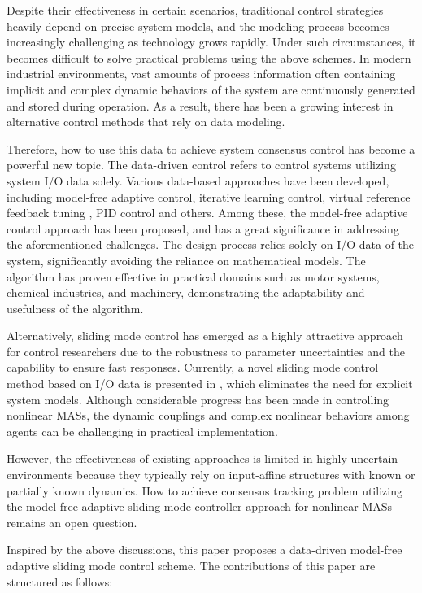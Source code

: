 \documentclass[journal,onecolumn]{IEEEtran}
\begin{document}
Despite their effectiveness in certain scenarios, traditional control strategies \cite{10,11,12,13} heavily depend on precise system models, and the modeling process becomes increasingly challenging as technology grows rapidly. Under such circumstances, it becomes difficult to solve practical problems using the above schemes. In modern industrial environments, vast amounts of process information often containing implicit and complex dynamic behaviors of the system are continuously generated and stored during operation. As a result, there has been a growing interest in alternative control methods that rely on data modeling. 

Therefore, how to use this data to achieve system consensus control has become a powerful new topic. The data-driven control \cite{17,18,19,20} refers to control systems utilizing system I/O data solely. Various data-based approaches have been developed, including model-free adaptive control, iterative learning control, virtual reference feedback tuning \cite{21}, PID control \cite{22} and others. Among these, the model-free adaptive control approach \cite{23,24,25} has been proposed, and has a great significance in addressing the aforementioned challenges. The design process relies solely on I/O data of the system, significantly avoiding the reliance on mathematical models. The algorithm has proven effective in practical domains such as motor systems, chemical industries, and machinery, demonstrating the adaptability and usefulness of the algorithm. 

Alternatively, sliding mode control \cite{26} has emerged as a highly attractive approach for control researchers due to the robustness to parameter uncertainties and the capability to ensure fast responses. Currently, a novel sliding mode control method based on I/O data is presented in \cite{27}, which eliminates the need for explicit system models. 
Although considerable progress has been made in controlling nonlinear MASs, the dynamic couplings and complex nonlinear behaviors among agents \cite{14} can be challenging in practical implementation.

However, the effectiveness of existing approaches \cite{31,32,33,34} is limited in highly uncertain environments because they typically rely on input-affine structures with known or partially known dynamics.
How to achieve consensus tracking problem utilizing the model-free adaptive sliding mode controller approach for nonlinear MASs remains an open question.

Inspired by the above discussions, this paper proposes a data-driven model-free adaptive sliding mode control scheme. The contributions of this paper are structured as follows:
\end{document}
